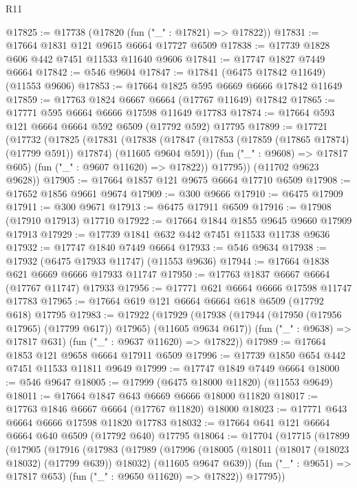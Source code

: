\begin{lexlean}{R11}
\begin{coremodule}
{{{{{{{{{{{{{{{{{{{{{{{{{{{{{{{{{{{{{{{{{{{{{{{{{{{{{{{{{{{{{{{{{{{{{{{{{{{{{{{{{{@17825 := @17738 (@17820 (fun ("_" : @17821) => @17822))
@17831 := @17664 @1831 @121 @9615 @6664 @17727 @6509
@17838 := @17739 @1828 @606 @442 @7451 @11533 @11640 @9606
@17841 := @17747 @1827 @7449 @6664
@17842 := @546 @9604
@17847 := @17841 (@6475 @17842 @11649) (@11553 @9606)
@17853 := @17664 @1825 @595 @6669 @6666 @17842 @11649
@17859 := @17763 @1824 @6667 @6664 (@17767 @11649) @17842
@17865 := @17771 @595 @6664 @6666 @17598 @11649 @17783
@17874 := @17664 @593 @121 @6664 @6664 @592 @6509 (@17792 @592) @17795
@17899 := @17721
    (@17732
      (@17825
        (@17831
          (@17838
            (@17847 (@17853 (@17859 (@17865 @17874) (@17799 @591)) @17874) (@11605 @9604 @591))
            (fun ("_" : @9608) => @17817 @605)
            (fun ("_" : @9607 @11620) => @17822))
          @17795))
      (@11702 @9623 @9628))
@17905 := @17664 @1857 @121 @9675 @6664 @17710 @6509
@17908 := @17652 @1856 @9661 @9674
@17909 := @300 @9666
@17910 := @6475 @17909
@17911 := @300 @9671
@17913 := @6475 @17911 @6509
@17916 := @17908 (@17910 @17913) @17710
@17922 := @17664 @1844 @1855 @9645 @9660 @17909 @17913
@17929 := @17739 @1841 @632 @442 @7451 @11533 @11738 @9636
@17932 := @17747 @1840 @7449 @6664
@17933 := @546 @9634
@17938 := @17932 (@6475 @17933 @11747) (@11553 @9636)
@17944 := @17664 @1838 @621 @6669 @6666 @17933 @11747
@17950 := @17763 @1837 @6667 @6664 (@17767 @11747) @17933
@17956 := @17771 @621 @6664 @6666 @17598 @11747 @17783
@17965 := @17664 @619 @121 @6664 @6664 @618 @6509 (@17792 @618) @17795
@17983 := @17922
    (@17929
      (@17938 (@17944 (@17950 (@17956 @17965) (@17799 @617)) @17965) (@11605 @9634 @617))
      (fun ("_" : @9638) => @17817 @631)
      (fun ("_" : @9637 @11620) => @17822))
@17989 := @17664 @1853 @121 @9658 @6664 @17911 @6509
@17996 := @17739 @1850 @654 @442 @7451 @11533 @11811 @9649
@17999 := @17747 @1849 @7449 @6664
@18000 := @546 @9647
@18005 := @17999 (@6475 @18000 @11820) (@11553 @9649)
@18011 := @17664 @1847 @643 @6669 @6666 @18000 @11820
@18017 := @17763 @1846 @6667 @6664 (@17767 @11820) @18000
@18023 := @17771 @643 @6664 @6666 @17598 @11820 @17783
@18032 := @17664 @641 @121 @6664 @6664 @640 @6509 (@17792 @640) @17795
@18064 := @17704
    (@17715
      (@17899
        (@17905
          (@17916
            (@17983
              (@17989
                (@17996
                  (@18005
                    (@18011 (@18017 (@18023 @18032) (@17799 @639)) @18032)
                    (@11605 @9647 @639))
                  (fun ("_" : @9651) => @17817 @653)
                  (fun ("_" : @9650 @11620) => @17822))
                @17795))
}}}}}}}}}}}}}}}}}}}}}}}}}}}}}}}}}}}}}}}}}}}}}}}}}}}}}}}}}}}}}}}}}}}}}}}}}}}}}}}}}}
\end{coremodule}
\end{lexlean}
